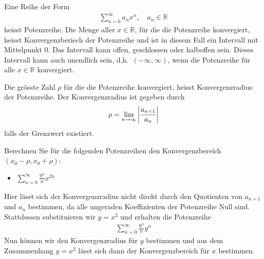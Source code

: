 \documentclass[12pt]{article}
\newcommand{\R}{\mathbb{R}} %
\newenvironment{definition}[2][Definition]{\begin{trivlist}
        \item[\hskip \labelsep {\bfseries #1}\hskip \labelsep {\bfseries #2.}]}{\flushright{$\square$}\end{trivlist}}
\newenvironment{problem}[2][\textcolor{blue}{Tipps \& Tricks zu}]{\begin{trivlist}
        \item[\hskip \labelsep {\bfseries #1}\hskip \labelsep {\bfseries \textcolor{blue}{#2}.}]}{\end{trivlist}}
\newenvironment{question}[2][\textcolor{red}{Aufgabe}]{\begin{trivlist}
        \item[\hskip \labelsep {\bfseries \textcolor{red}{#1}}\hskip \labelsep {\bfseries \textcolor{red}{#2}.}]}{\end{trivlist}}
\begin{document}
\begin{definition}{[Potenzreihen]}
    Eine Reihe der Form
    \begin{align*}
        \sum_{n=0}^{\infty}a_n x^n, \quad a_n\in\R
    \end{align*}
    heisst Potenzreihe. Die Menge aller $x\in\R$, für die die Potenzreihe konvergiert, heisst Konvergenzberiech der Potenzreihe und ist in diesem Fall ein Intervall mit Mittelpunkt $0$. Das Intervall kann offen, geschlossen oder halboffen sein. Dieses Intervall kann auch unendlich sein, d.h.\ $(-\infty, \infty)$, wenn die Potenzreihe für alle $x\in\R$ konvergiert.

    Die grösste Zahl $\rho$ für die die Potenzreihe konvergiert, heisst
    Konvergenzradius der Potenzreihe. Der Konvergenzradius ist gegeben durch
    \begin{align*}
        \rho=\lim_{n\to\infty}\abs{\frac{a_{n+1}}{a_n}}
    \end{align*}
    falls der Grenzwert existiert.
\end{definition}

\begin{question}{3c}
    Berechnen Sie für die folgenden Potenzreihen den Konvergenzbereich $(x_0 - \rho, x_0 + \rho)$:
    \begin{itemize}
        \item $\sum_{n=0}^{\infty}\frac{9^n}{n}x^{2n}$
    \end{itemize}
\end{question}

\begin{problem}{3c)}
Hier lässt sich der Konvergenzradius nicht direkt durch den Quotienten von $a_{n+1}$ und $a_n$ bestimmen, da alle ungeraden Koeffizienten der Potenzreihe Null sind. Stattdessen substituieren wir $y=x^2$ und erhalten die Potenzreihe
\begin{align*}
    \sum_{n=0}^{\infty}\frac{9^n}{n}y^n
\end{align*}
Nun können wir den Konvergenzradius für $y$ bestimmen und aus dem Zusammenhang $y=x^2$ lässt sich dann der Konvergenzbereich für $x$ bestimmen.
\end{problem}
\end{document}
